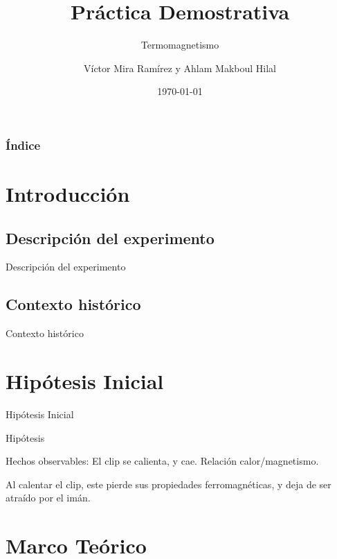 \documentclass[10pt]{beamer}
\title[Universidad de Alicante]{\textrm{\textbf{Práctica Demostrativa}}}
\subtitle{\textrm{Termomagnetismo}}
\author[vmr48@alu.ua.es y amhm10@alu.ua.es]{\textrm{Víctor Mira Ramírez y Ahlam Makboul Hilal}}
\institute[]{\textrm{Universidad de Alicante}}
\date[\today]{\textrm{\today}}
\begin{document}
\frame{\titlepage}
\begin{frame}
\frametitle{\textrm{Índice}}
\tableofcontents
\end{frame}
\section{\textrm{Introducción}}
    \subsection{Descripción del experimento}
    \begin{frame}{\textrm{Descripción del experimento}}

    \end{frame}
    \subsection{Contexto histórico}
    \begin{frame}{\textrm{Contexto histórico}}

    \end{frame}

\section{\textrm{Hipótesis Inicial}}
    \begin{frame}{\textrm{Hipótesis Inicial}}

    \begin{block}{Hipótesis}

    Hechos observables: El clip se calienta, y cae. 
    Relación calor/magnetismo. 
    
    Al calentar el clip, este pierde sus propiedades ferromagnéticas, y deja de ser atraído por el imán. 
    \end{block}


    \end{frame}
\section{\textrm{Marco Teórico}}
\end{document}
